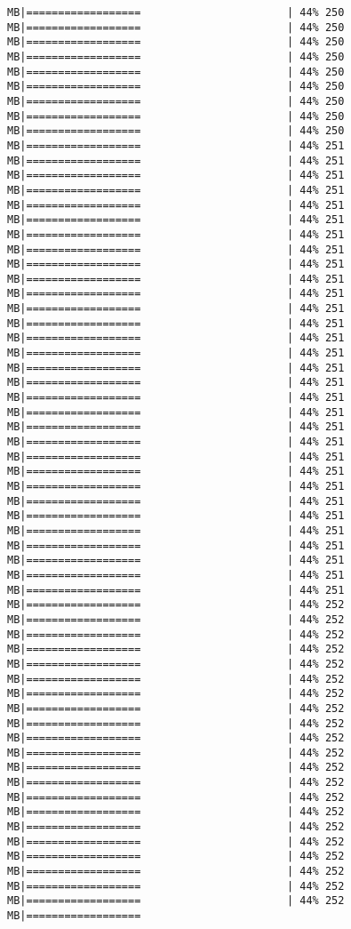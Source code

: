 \documentclass[
]{article}
\begin{document}
\begin{verbatim}
MB|==================                       | 44% 250 MB|==================                       | 44% 250 MB|==================                       | 44% 250 MB|==================                       | 44% 250 MB|==================                       | 44% 250 MB|==================                       | 44% 250 MB|==================                       | 44% 250 MB|==================                       | 44% 250 MB|==================                       | 44% 250 MB|==================                       | 44% 251 MB|==================                       | 44% 251 MB|==================                       | 44% 251 MB|==================                       | 44% 251 MB|==================                       | 44% 251 MB|==================                       | 44% 251 MB|==================                       | 44% 251 MB|==================                       | 44% 251 MB|==================                       | 44% 251 MB|==================                       | 44% 251 MB|==================                       | 44% 251 MB|==================                       | 44% 251 MB|==================                       | 44% 251 MB|==================                       | 44% 251 MB|==================                       | 44% 251 MB|==================                       | 44% 251 MB|==================                       | 44% 251 MB|==================                       | 44% 251 MB|==================                       | 44% 251 MB|==================                       | 44% 251 MB|==================                       | 44% 251 MB|==================                       | 44% 251 MB|==================                       | 44% 251 MB|==================                       | 44% 251 MB|==================                       | 44% 251 MB|==================                       | 44% 251 MB|==================                       | 44% 251 MB|==================                       | 44% 251 MB|==================                       | 44% 251 MB|==================                       | 44% 251 MB|==================                       | 44% 251 MB|==================                       | 44% 252 MB|==================                       | 44% 252 MB|==================                       | 44% 252 MB|==================                       | 44% 252 MB|==================                       | 44% 252 MB|==================                       | 44% 252 MB|==================                       | 44% 252 MB|==================                       | 44% 252 MB|==================                       | 44% 252 MB|==================                       | 44% 252 MB|==================                       | 44% 252 MB|==================                       | 44% 252 MB|==================                       | 44% 252 MB|==================                       | 44% 252 MB|==================                       | 44% 252 MB|==================                       | 44% 252 MB|==================                       | 44% 252 MB|==================                       | 44% 252 MB|==================                       | 44% 252 MB|==================                       | 44% 252 MB|==================                       | 44% 252 MB|==================    
\end{verbatim}
\end{document}
